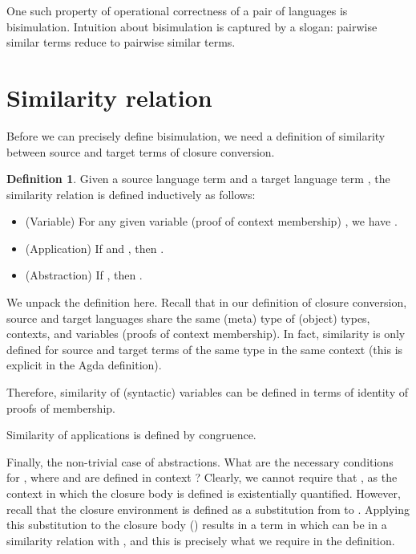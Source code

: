 \documentclass[bsc,frontabs,twoside,singlespacing,parskip,deptreport]{infthesis}
\theoremstyle{definition}
\newtheorem*{definition}{Definition}
\begin{document}
One such property of operational correctness of a pair of languages is
bisimulation. Intuition about bisimulation is captured by a slogan:
pairwise similar terms reduce to pairwise similar terms. 

\section{Similarity relation}

Before we can precisely define
bisimulation, we need a definition of similarity between source
and target terms of closure conversion.


\begin{definition}
  Given a source language term  and a target language term ,
  the similarity relation  is defined inductively as
  follows:

  \begin{itemize}
  \item
    (Variable) For any given variable (proof of context membership) , we have
    .

  \item
    (Application) If  and ,
    then .

  \item
    (Abstraction) If ,
    then .
  \end{itemize}
\end{definition}

We unpack the definition here. Recall that in our definition of
closure conversion, source and target languages share the same (meta)
type of (object) types, contexts, and variables (proofs of context
membership). In fact, similarity is only defined for source and target
terms of the same type in the same context (this is explicit in the Agda
definition). 

Therefore, similarity of (syntactic) variables can be defined in terms
of identity of proofs of membership.

Similarity of applications is defined by congruence.

Finally, the non-trivial case of abstractions. What are the necessary
conditions for , where  and 
 are defined in context ? Clearly, we cannot require
that , as the context  in which the closure body is
defined is existentially quantified. However, recall that the closure environment
 is defined as a substitution from  to . Applying
this substitution to the closure body ()
results in a term in  which can be in a similarity relation with
, and this is precisely what we require in the definition.
\end{document}
